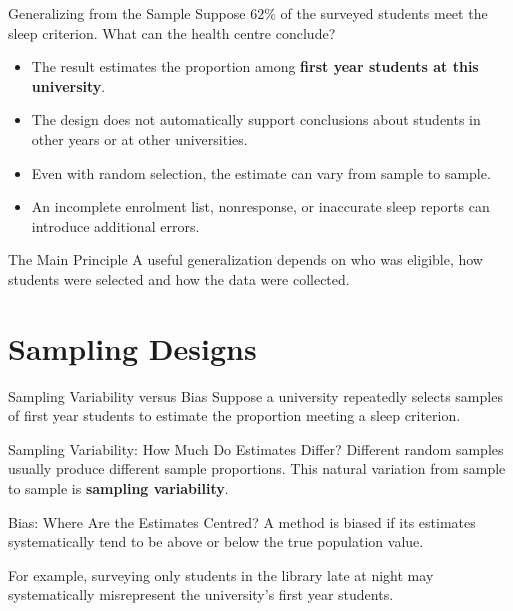 \documentclass[aspectratio=169]{beamer}
\begin{document}
\begin{frame}{Generalizing from the Sample}
Suppose $62\%$ of the surveyed students meet the sleep criterion. What can the health centre conclude?

\begin{itemize}
	\item The result estimates the proportion among \textbf{first year students at this university}.
	\item The design does not automatically support conclusions about students in other years or at other universities.
	\item Even with random selection, the estimate can vary from sample to sample.
	\item An incomplete enrolment list, nonresponse, or inaccurate sleep reports can introduce additional errors.
\end{itemize}

\begin{block}{The Main Principle}
A useful generalization depends on who was eligible, how students were selected and how the data were collected.
\end{block}
\end{frame}

\section{Sampling Designs}

\begin{frame}{Sampling Variability versus Bias}
Suppose a university repeatedly selects samples of first year students to estimate the proportion meeting a sleep criterion.

\begin{block}{Sampling Variability: How Much Do Estimates Differ?}
Different random samples usually produce different sample proportions. This natural variation from sample to sample is \textbf{sampling variability}.
\end{block}

\begin{block}{Bias: Where Are the Estimates Centred?}
A method is biased if its estimates systematically tend to be above or below the true population value.

For example, surveying only students in the library late at night may systematically misrepresent the university's first year students.
\end{block}
\end{frame}
\end{document}
